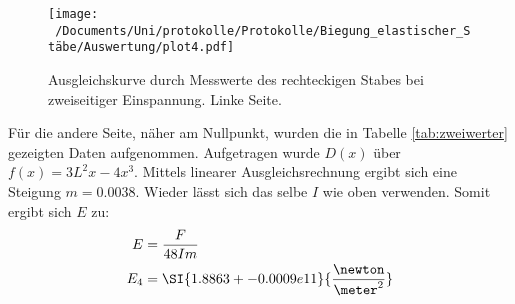 \begin{figure}
  \centering
  \texttt{[image: ~/Documents/Uni/protokolle/Protokolle/Biegung\_elastischer\_Stäbe/Auswertung/plot4.pdf]}
  \caption{Ausgleichskurve durch Messwerte des rechteckigen Stabes bei zweiseitiger Einspannung. Linke Seite.}
  \label{fig:kurveRechtlinks}
\end{figure}

Für die andere Seite, näher am Nullpunkt, wurden die in Tabelle \ref{tab:zweiwerter} gezeigten Daten aufgenommen. Aufgetragen wurde $D(x)$ über $f(x)=3L^2x-4x^3$.
Mittels linearer Ausgleichsrechnung ergibt sich eine Steigung $m=\num{0.0038}$. Wieder lässt sich das selbe $I$ wie oben verwenden. Somit ergibt sich $E$ zu:
\begin{align*}
  E   &= \frac{F}{48Im} \\
  E_4 &= \SI{1.8863+-0.0009e11}{\frac{\newton}{\meter^2}} \\
\end{align*}

